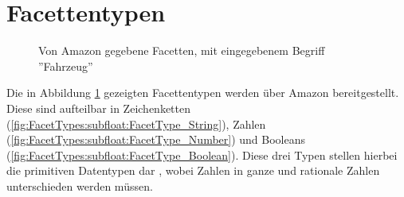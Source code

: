 \section{Facettentypen}
\label{sec:Konzeption:FacetTypes}

\begin{figure}[h]
    \myfloatalign
    \caption{Von Amazon gegebene Facetten, mit eingegebenem Begriff ''Fahrzeug''}
    \label{fig:FacetTypes:Amazon_FacetTypes}
\end{figure}

Die in Abbildung \ref{fig:FacetTypes:Amazon_FacetTypes} gezeigten Facettentypen werden über Amazon bereitgestellt.
Diese sind aufteilbar in Zeichenketten (\ref{fig:FacetTypes:subfloat:FacetType_String}), Zahlen (\ref{fig:FacetTypes:subfloat:FacetType_Number}) und Booleans (\ref{fig:FacetTypes:subfloat:FacetType_Boolean}). Diese drei Typen stellen hierbei die primitiven Datentypen dar \cite{TODO primitivie Datentypen}, wobei Zahlen in ganze und rationale Zahlen unterschieden werden müssen.

